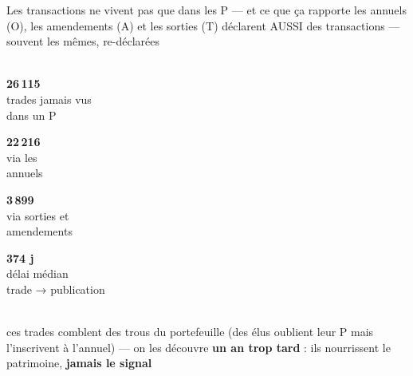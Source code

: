 \documentclass[11pt,aspectratio=169]{beamer}
\newcommand{\tuile}[3]{%
  \begin{minipage}[t]{0.23\textwidth}\centering
    \colorbox{#1}{\parbox[c][21mm][c]{\dimexpr\linewidth-8pt}{\centering
      {\color{white}\Large\textbf{#2}}\\[0.6mm]
      {\color{white}\footnotesize #3}}}
  \end{minipage}}
\begin{document}
\begin{frame}{Les transactions ne vivent pas que dans les P — et ce que ça rapporte}
  \centering
  {\footnotesize les annuels (O), les amendements (A) et les sorties (T) déclarent AUSSI
   des transactions — souvent les mêmes, re-déclarées}\\[3mm]
  \\[3.5mm]
  \tuile{okgreen}{26\,115}{trades jamais vus\\dans un P}\hfill
  \tuile{dataC}{22\,216}{via les\\annuels}\hfill
  \tuile{dataC}{3\,899}{via sorties et\\amendements}\hfill
  \tuile{grisC}{374 j}{délai médian\\trade → publication}\\[2.5mm]
  {\footnotesize ces trades comblent des trous du portefeuille (des élus oublient leur P mais
   l'inscrivent à l'annuel) — on les découvre \textbf{un an trop tard} : ils nourrissent le
   patrimoine, \textbf{jamais le signal}}
\end{frame}
\end{document}
